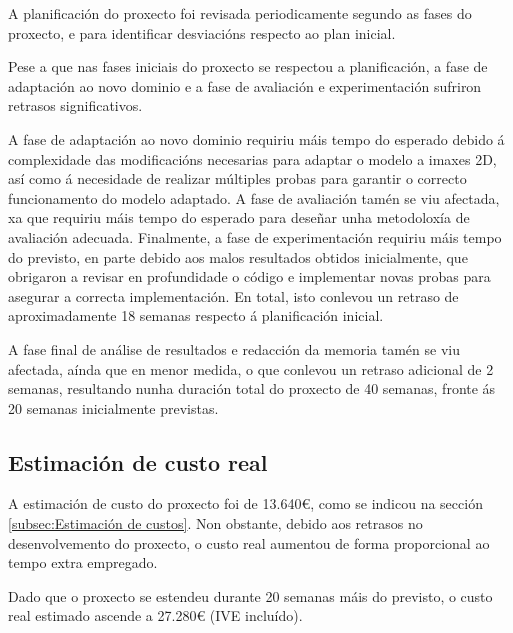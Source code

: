 A planificación do proxecto foi revisada periodicamente segundo as fases do proxecto, e para identificar desviacións respecto ao plan inicial.

Pese a que nas fases iniciais do proxecto se respectou a planificación, a fase de adaptación ao novo dominio e a fase de avaliación e experimentación sufriron retrasos significativos.

A fase de adaptación ao novo dominio requiriu máis tempo do esperado debido á complexidade das modificacións necesarias para adaptar o modelo a imaxes 2D, así como á necesidade de realizar múltiples probas para garantir o correcto funcionamento do modelo adaptado. A fase de avaliación tamén se viu afectada, xa que requiriu máis tempo do esperado para deseñar unha metodoloxía de avaliación adecuada. Finalmente, a fase de experimentación requiriu máis tempo do previsto, en parte debido aos malos resultados obtidos inicialmente, que obrigaron a revisar en profundidade o código e implementar novas probas para asegurar a correcta implementación.
En total, isto conlevou un retraso de aproximadamente 18 semanas respecto á planificación inicial.

A fase final de análise de resultados e redacción da memoria tamén se viu afectada, aínda que en menor medida, o que conlevou un retraso adicional de 2 semanas, resultando nunha duración total do proxecto de 40 semanas, fronte ás 20 semanas inicialmente previstas.

\subsection{Estimación de custo real}
\label{subsec:Estimación de custo real}

A estimación de custo do proxecto foi de 13.640€, como se indicou na sección \ref{subsec:Estimación de custos}. Non obstante, debido aos retrasos no desenvolvemento do proxecto, o custo real aumentou de forma proporcional ao tempo extra empregado.

Dado que o proxecto se estendeu durante 20 semanas máis do previsto, o custo real estimado ascende a 27.280€ (IVE incluído).